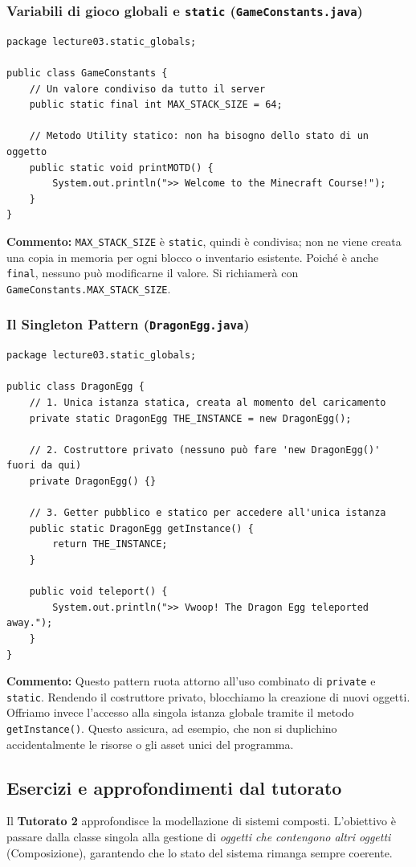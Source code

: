 \documentclass[12pt, a4paper]{article}
\begin{document}
\subsubsection{Variabili di gioco globali e \texttt{static} (\texttt{GameConstants.java})}
\begin{verbatim}
package lecture03.static_globals;

public class GameConstants {
    // Un valore condiviso da tutto il server
    public static final int MAX_STACK_SIZE = 64; 

    // Metodo Utility statico: non ha bisogno dello stato di un oggetto
    public static void printMOTD() {
        System.out.println(">> Welcome to the Minecraft Course!");
    }
}
\end{verbatim}
\textbf{Commento:} \texttt{MAX\_STACK\_SIZE} è \texttt{static}, quindi è condivisa; non ne viene creata una copia in memoria per ogni blocco o inventario esistente. Poiché è anche \texttt{final}, nessuno può modificarne il valore. Si richiamerà con \texttt{GameConstants.MAX\_STACK\_SIZE}.

\subsubsection{Il Singleton Pattern (\texttt{DragonEgg.java})}
\begin{verbatim}
package lecture03.static_globals;

public class DragonEgg {
    // 1. Unica istanza statica, creata al momento del caricamento
    private static DragonEgg THE_INSTANCE = new DragonEgg();

    // 2. Costruttore privato (nessuno può fare 'new DragonEgg()' fuori da qui)
    private DragonEgg() {}

    // 3. Getter pubblico e statico per accedere all'unica istanza
    public static DragonEgg getInstance() {
        return THE_INSTANCE;
    }

    public void teleport() {
        System.out.println(">> Vwoop! The Dragon Egg teleported away.");
    }
}
\end{verbatim}
\textbf{Commento:} Questo pattern ruota attorno all'uso combinato di \texttt{private} e \texttt{static}. Rendendo il costruttore privato, blocchiamo la creazione di nuovi oggetti. Offriamo invece l'accesso alla singola istanza globale tramite il metodo \texttt{getInstance()}. Questo assicura, ad esempio, che non si duplichino accidentalmente le risorse o gli asset unici del programma.
\subsection{Esercizi e approfondimenti dal tutorato}
Il \textbf{Tutorato 2} approfondisce la modellazione di sistemi composti. L'obiettivo è passare dalla classe singola alla gestione di \textit{oggetti che contengono altri oggetti} (Composizione), garantendo che lo stato del sistema rimanga sempre coerente.
\end{document}
